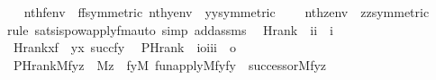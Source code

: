 \begin{isabellebody}
%
\isadelimproof
\ \ %
\endisadelimproof
%
\isatagproof
{}\isamarkupfalse%
\ {\isacartoucheopen}nth{\isacharparenleft}{\kern0pt}f{\isacharcomma}{\kern0pt}env{\isacharparenright}{\kern0pt}\ {\isacharequal}{\kern0pt}\ ff{\isacartoucheclose}{\isacharbrackleft}{\kern0pt}symmetric{\isacharbrackright}{\kern0pt}\ {\isacartoucheopen}nth{\isacharparenleft}{\kern0pt}y{\isacharcomma}{\kern0pt}env{\isacharparenright}{\kern0pt}\ {\isacharequal}{\kern0pt}\ yy{\isacartoucheclose}{\isacharbrackleft}{\kern0pt}symmetric{\isacharbrackright}{\kern0pt}\isanewline
\ \ \ \ {\isacartoucheopen}nth{\isacharparenleft}{\kern0pt}z{\isacharcomma}{\kern0pt}env{\isacharparenright}{\kern0pt}\ {\isacharequal}{\kern0pt}\ zz{\isacartoucheclose}{\isacharbrackleft}{\kern0pt}symmetric{\isacharbrackright}{\kern0pt}\isanewline
\ \ \isamarkupfalse%
\ {\isacharparenleft}{\kern0pt}rule\ sats{\isacharunderscore}{\kern0pt}is{\isacharunderscore}{\kern0pt}powapply{\isacharunderscore}{\kern0pt}fm{\isacharunderscore}{\kern0pt}auto{\isacharparenleft}{\kern0pt}{}{\isacharparenright}{\kern0pt}{\isacharsemicolon}{\kern0pt}\ simp\ add{\isacharcolon}{\kern0pt}assms{\isacharparenright}{\kern0pt}%
\endisatagproof
{\isafoldproof}%
%
\isadelimproof
\isanewline
%
\endisadelimproof
\isanewline
\isanewline
{}\isamarkupfalse%
\isanewline
\ \ Hrank\ {\isacharcolon}{\kern0pt}{\isacharcolon}{\kern0pt}\ {\isachardoublequoteopen}{\isacharbrackleft}{\kern0pt}i{\isacharcomma}{\kern0pt}i{\isacharbrackright}{\kern0pt}\ {\isasymRightarrow}\ i{\isachardoublequoteclose}\ \isanewline
\ \ {\isachardoublequoteopen}Hrank{\isacharparenleft}{\kern0pt}x{\isacharcomma}{\kern0pt}f{\isacharparenright}{\kern0pt}\ {\isacharequal}{\kern0pt}\ {\isacharparenleft}{\kern0pt}{\isasymUnion}y{\isasymin}x{\isachardot}{\kern0pt}\ succ{\isacharparenleft}{\kern0pt}f{\isacharbackquote}{\kern0pt}y{\isacharparenright}{\kern0pt}{\isacharparenright}{\kern0pt}{\isachardoublequoteclose}\isanewline
\isanewline
{}\isamarkupfalse%
\isanewline
\ \ PHrank\ {\isacharcolon}{\kern0pt}{\isacharcolon}{\kern0pt}\ {\isachardoublequoteopen}{\isacharbrackleft}{\kern0pt}i{\isasymRightarrow}o{\isacharcomma}{\kern0pt}i{\isacharcomma}{\kern0pt}i{\isacharcomma}{\kern0pt}i{\isacharbrackright}{\kern0pt}\ {\isasymRightarrow}\ o{\isachardoublequoteclose}\ \isanewline
\ \ {\isachardoublequoteopen}PHrank{\isacharparenleft}{\kern0pt}M{\isacharcomma}{\kern0pt}f{\isacharcomma}{\kern0pt}y{\isacharcomma}{\kern0pt}z{\isacharparenright}{\kern0pt}\ {\isasymequiv}\ M{\isacharparenleft}{\kern0pt}z{\isacharparenright}{\kern0pt}\ {\isasymand}\ {\isacharparenleft}{\kern0pt}{\isasymexists}fy{\isacharbrackleft}{\kern0pt}M{\isacharbrackright}{\kern0pt}{\isachardot}{\kern0pt}\ fun{\isacharunderscore}{\kern0pt}apply{\isacharparenleft}{\kern0pt}M{\isacharcomma}{\kern0pt}f{\isacharcomma}{\kern0pt}y{\isacharcomma}{\kern0pt}fy{\isacharparenright}{\kern0pt}\ {\isasymand}\ successor{\isacharparenleft}{\kern0pt}M{\isacharcomma}{\kern0pt}fy{\isacharcomma}{\kern0pt}z{\isacharparenright}{\kern0pt}{\isacharparenright}{\kern0pt}{\isachardoublequoteclose}\isanewline

\end{isabellebody}
